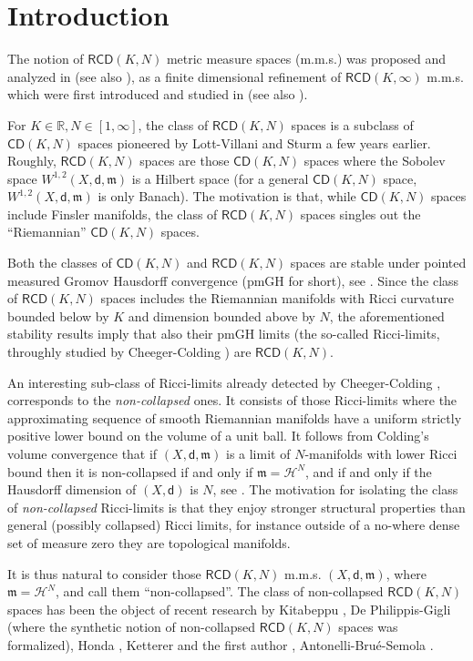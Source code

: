\documentclass[a4paper]{amsart}
\theoremstyle{plain}
\theoremstyle{definition}
\numberwithin{equation}{section}
\newcommand{\R}{\mathbb{R}}
\newcommand{\RCD}{\mathsf{RCD}}
\newcommand{\CD}{\mathsf{CD}}
\newcommand{\mm}{\mathfrak m}
\newcommand{\sfd}{\mathsf d}
\newcommand{\cH}{\mathcal{H}}
\begin{document}
\section{Introduction}
{
The notion of $\RCD(K,N)$ metric measure spaces (m.m.s.) was proposed and analyzed in \cite{gigli:laplacian, EKS, AMS} (see also \cite{CaMi}), as a finite
dimensional refinement of  $\RCD(K,\infty)$ m.m.s. which were first introduced  and studied in \cite{AGS} (see also \cite{AGMR12}).

 For  $K\in \R, N\in [1,\infty]$, the class of $\RCD(K,N)$ spaces is a subclass of $\CD(K,N)$ spaces pioneered by Lott-Villani  \cite{lottvillani:metric} and Sturm \cite{sturm:I, sturm:II} a few years earlier.  Roughly,  $\RCD(K,N)$ spaces are those $\CD(K,N)$ spaces where the Sobolev space $W^{1,2}(X,\sfd,\mm)$ is a Hilbert space (for a general $\CD(K,N)$ space, $W^{1,2}(X,\sfd,\mm)$ is only  Banach).
The motivation is that, while $\CD(K,N)$ spaces include Finsler manifolds, the class of $\RCD(K,N)$ spaces singles out the ``Riemannian''  $\CD(K,N)$ spaces.

 Both the classes of $\CD(K,N)$ and $\RCD(K,N)$ spaces are stable under pointed measured Gromov Hausdorff convergence  (pmGH for short), see \cite{lottvillani:metric, sturm:I, sturm:II, Vil, AGS, GMS2013}.
 Since the class of $\RCD(K,N)$ spaces includes the Riemannian manifolds with Ricci curvature bounded below by $K$ and dimension bounded above by $N$, the aforementioned stability  results imply that also their pmGH limits (the so-called Ricci-limits, throughly studied by Cheeger-Colding \cite{CC97, CC00a, CC00b}) are $\RCD(K,N)$.
 
 An interesting sub-class of Ricci-limits  already detected by Cheeger-Colding  \cite{CC97}, corresponds to the \emph{non-collapsed} ones. It consists of those Ricci-limits where the approximating sequence of smooth Riemannian manifolds have a uniform strictly positive lower bound on the volume of a unit ball. It follows from Colding's volume convergence \cite{Col97} that if $(X,\sfd,\mm)$ is a limit of $N$-manifolds with lower Ricci bound then it is non-collapsed if and only if $\mm=\cH^{N}$, and if and only if the Hausdorff dimension of $(X,\sfd)$ is $N$, see \cite{CC97}. The motivation for isolating the class of  \emph{non-collapsed} Ricci-limits is that they enjoy stronger structural properties than general (possibly collapsed) Ricci limits, for instance outside of a no-where dense set of measure zero they are topological manifolds.

 It is thus natural to consider those $\RCD(K,N)$ m.m.s. $(X,\sfd,\mm)$, where $\mm=\cH^{N}$, and call them ``non-collapsed''. The class of non-collapsed $\RCD(K,N)$ spaces has been the object of recent research by Kitabeppu \cite{Kitab-noncol}, De Philippis-Gigli \cite{GDPNonColl} (where the synthetic notion of non-collapsed $\RCD(K,N)$ spaces was formalized), Honda \cite{HondaNC}, Ketterer and the first author \cite{Kap-Ket-18}, Antonelli-Bru\'e-Semola \cite{Ant-Brue-Sem-19}. 

}
\end{document}

